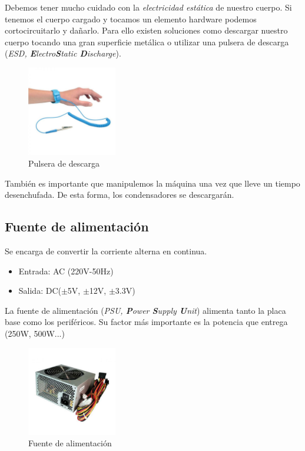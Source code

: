 \documentclass[12pt,spanish]{article}
\begin{document}
Debemos tener mucho cuidado con la \textit{electricidad estática} de nuestro cuerpo. Si tenemos el cuerpo cargado y tocamos un elemento hardware podemos cortocircuitarlo y dañarlo. Para ello existen soluciones como descargar nuestro cuerpo tocando una gran superficie metálica o utilizar una pulsera de descarga (\textit{ESD, \textbf{E}lectro\textbf{S}tatic \textbf{D}ischarge}).

\begin{figure}[H]
	\centering
	\includegraphics[width=0.35\textwidth]{esd.jpg}
	\caption{Pulsera de descarga}
\end{figure}
También es importante que manipulemos la máquina una vez que lleve un tiempo desenchufada. De esta forma, los condensadores se descargarán.

\subsection{Fuente de alimentación}
Se encarga de convertir la corriente alterna en continua.
\begin{itemize}
	\item Entrada: AC (220V-50Hz)
	\item Salida: DC($\pm$5V, $\pm$12V, $\pm$3.3V)
\end{itemize}
La fuente de alimentación (\textit{PSU, \textbf{P}ower \textbf{S}upply \textbf{U}nit}) alimenta tanto la placa base como los periféricos. Su factor más importante es la potencia que entrega (250W, 500W...)
\begin{figure}[H]
	\centering
	\includegraphics[width=0.35\textwidth]{psu.jpg}
	\caption{Fuente de alimentación}
\end{figure}
\end{document}
